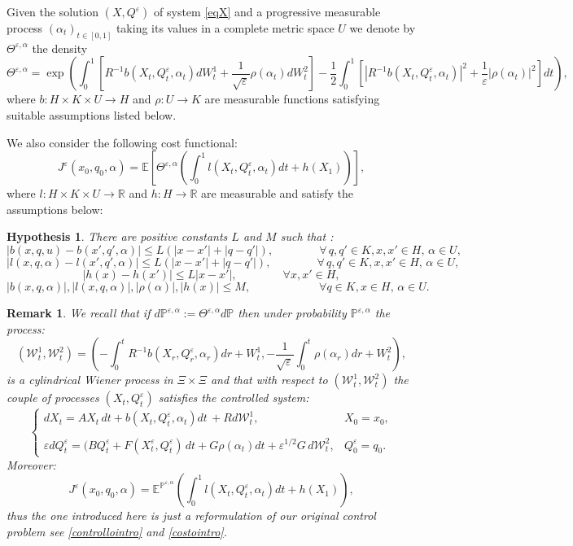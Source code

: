 \documentclass[reqno,a4paper,11 pt]{article}
\def \E {\mathbb{E}}
\def \e {\varepsilon}
\newtheorem{hypothesis}[theorem]{Hypothesis}
\newtheorem{remark}[theorem]{Remark}
\numberwithin{equation}{section}
\begin{document}
\medskip


Given the solution $(X,Q^{\e})$ of system \eqref{eqX} and a progressive measurable process $(\alpha_t)_{t\in [0,1 ]}$ taking its values in a complete metric space $U$ we denote by $\Theta^{\e,\alpha}$ the density
$$\Theta^{\e,\alpha}=\exp\left(\int_0^1 \left[ R^{-1}b(X_t,Q^\e_t,\alpha_t) dW^1_t + \frac{1}{\sqrt{\e}}\rho(\alpha_t)dW^2_t\right]-\frac{1}{2}\int_0^1 \!\!
\left[|R^{-1}b(X_t,Q^\e_t,\alpha_t)|^2+\frac{1}{\e}|\rho(\alpha_t)|^2\right]dt\right),$$
where $b: H\times K\times U \rightarrow H$ and $\rho: U \rightarrow K$ are measurable functions satisfying suitable assumptions listed below.

We also consider the following cost functional:
\begin{equation} \label{cost_epsilon}
J^{\e}(x_0,q_0,\alpha)= \E\left[\Theta^{\e,\alpha}\left( \int_0^1 l(X_t, Q^\e_t, \alpha_t)dt + h (X_1)\right)\right],
\end{equation}
where $l: H\times K\times U\rightarrow \mathbb{R}$ and $h: H \rightarrow \mathbb{R}$ are measurable and  satisfy the assumptions below:
\begin{hypothesis}\label{C.1}
There are positive constants $L$ and $M$ such that :
$$ |b(x,q,u)- b(x',q',\alpha)| \leq L (|x-x'|+|q-q'|),\qquad \qquad \forall \, q,q' \in K,  x, x' \in H, \, \alpha \in U,$$
$$ |l(x,q,\alpha)- l(x',q',\alpha)| \leq L (|x-x'|+|q-q'|),\qquad \qquad \forall \, q,q' \in K,  x, x' \in H, \, \alpha \in U,$$
$$ |h(x)- h(x')| \leq L |x-x'|,\qquad \qquad \forall x, x' \in H, $$
$$|b(x,q,\alpha)|, |l(x,q,\alpha)|, |\rho(\alpha)|, |h(x)| \leq M,\qquad \qquad \qquad  \forall q \in K, x \in H, \, \alpha \in U. $$
\end{hypothesis}
\begin{remark} \label{rem-equiv-weak}
We recall that if $d\mathbb{P}^{\e,\alpha}:=\Theta^{\e,\alpha} d\mathbb{P}$ then under probability $\mathbb{P}^{\e,\alpha}$ the process:
$$(\mathcal{W}^1_t,\mathcal{W}^2_t)=
(-\int_0^t R^{-1}b(X_r,Q^{\e}_r,\alpha_r)dr+{W}^1_t,-  \frac{1}{\sqrt{\e}}\int_0^t \rho(\alpha_r)dr+W^2_t),$$
is a cylindrical Wiener process in $\Xi\times \Xi$ and that with respect to $(\mathcal{W}^1_t,\mathcal{W}^2_t)$ the couple of processes $(X_t, Q^\e_t)$ satisfies the controlled system:
\begin{equation}
\label{eqcontr}
\begin{cases}
dX_t= AX_t \, dt  +  b(X_t,Q^{\e}_t,\alpha_t)dt \,+ R d\mathcal{W}^1_t, & X_0=x_0, \\ \\
 \e dQ^\e_t= (BQ^\e_t+ F(X^\e_t,Q^\e_t) \,dt +  G\rho(\alpha_t)dt+ \e^{1/2} G \, d \mathcal{W}^2_t, & Q^\e_0=q_0.
\end{cases}
\end{equation}
Moreover:
$$
J^{\e}(x_0,q_0,\alpha)= \E^{\mathbb{P}^{\e,\alpha}}\left( \int_0^1 l(X_t, Q^\e_t, \alpha_t)dt + h (X_1)\right),$$
thus the one introduced here is just a reformulation of our original control problem see
\eqref{controllointro} and \eqref{costointro}.
\end{remark}
\end{document}
